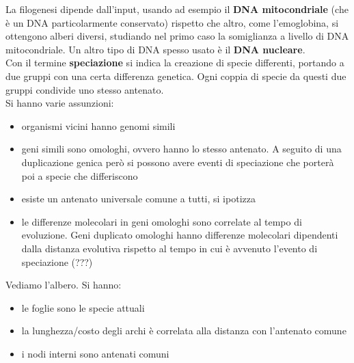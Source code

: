 \documentclass[a4paper,12pt, oneside]{book}
\begin{document}
La filogenesi dipende dall'input, usando ad esempio il \textbf{DNA
  mitocondriale} (che è 
un DNA particolarmente conservato) rispetto che altro, come l'emoglobina, si
ottengono alberi 
diversi, studiando nel primo caso la somiglianza a livello di DNA
mitocondriale. Un altro tipo di DNA spesso usato è il \textbf{DNA nucleare}.\\
Con il termine \textbf{speciazione} si indica la creazione di specie differenti,
portando a due gruppi con una certa differenza genetica. Ogni coppia di specie
da questi due gruppi condivide uno stesso antenato.\\
Si hanno varie assunzioni:
\begin{itemize}
  \item organismi vicini hanno genomi simili
  \item geni simili sono omologhi, ovvero hanno lo stesso antenato. A seguito di
  una duplicazione genica però si possono avere eventi di speciazione che
  porterà poi a specie che differiscono
  \item esiste un antenato universale comune a tutti, si ipotizza
  \item le differenze molecolari in geni omologhi sono correlate al tempo di
  evoluzione. Geni duplicato omologhi hanno differenze molecolari dipendenti
  dalla distanza evolutiva rispetto al tempo in cui è avvenuto l'evento di
  speciazione (???)
\end{itemize}
Vediamo l'albero. Si hanno:
\begin{itemize}
  \item le foglie sono le specie attuali
  \item la lunghezza/costo degli archi è correlata alla distanza con l'antenato
  comune 
  \item i nodi interni sono antenati comuni
\end{itemize}
\end{document}
